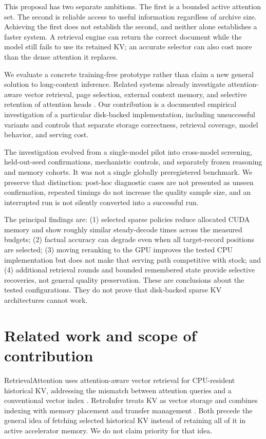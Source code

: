 \documentclass[11pt,letterpaper]{article}
\begin{document}
This proposal has two separate ambitions. The first is a bounded active attention set. The second is reliable access to useful information regardless of archive size. Achieving the first does not establish the second, and neither alone establishes a faster system. A retrieval engine can return the correct document while the model still fails to use its retained KV; an accurate selector can also cost more than the dense attention it replaces.

We evaluate a concrete training-free prototype rather than claim a new general solution to long-context inference. Related systems already investigate attention-aware vector retrieval, page selection, external context memory, and selective retention of attention heads \cite{liu2024retrievalattention,chen2025retroinfer,tang2024quest,xiao2024infllm,xiao2024duoattention}. Our contribution is a documented empirical investigation of a particular disk-backed implementation, including unsuccessful variants and controls that separate storage correctness, retrieval coverage, model behavior, and serving cost.

The investigation evolved from a single-model pilot into cross-model screening, held-out-seed confirmations, mechanistic controls, and separately frozen reasoning and memory cohorts. It was not a single globally preregistered benchmark. We preserve that distinction: post-hoc diagnostic cases are not presented as unseen confirmation, repeated timings do not increase the quality sample size, and an interrupted run is not silently converted into a successful run.

The principal findings are: (1) selected sparse policies reduce allocated CUDA memory and show roughly similar steady-decode times across the measured budgets; (2) factual accuracy can degrade even when all target-record positions are selected; (3) moving reranking to the GPU improves the tested CPU implementation but does not make that serving path competitive with stock; and (4) additional retrieval rounds and bounded remembered state provide selective recoveries, not general quality preservation. These are conclusions about the tested configurations. They do not prove that disk-backed sparse KV architectures cannot work.

\section{Related work and scope of contribution}
RetrievalAttention uses attention-aware vector retrieval for CPU-resident historical KV, addressing the mismatch between attention queries and a conventional vector index \cite{liu2024retrievalattention}. RetroInfer treats KV as vector storage and combines indexing with memory placement and transfer management \cite{chen2025retroinfer}. Both precede the general idea of fetching selected historical KV instead of retaining all of it in active accelerator memory. We do not claim priority for that idea.
\end{document}
